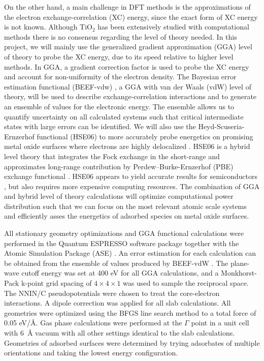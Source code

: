   
On the other hand, a main challenge in DFT methods \cite{Burke_2012, Parr_1980} is the approximations of the electron exchange-correlation (XC) energy, since the exact form of XC energy is not known. Although TiO$_2$ has been extensively studied with computational methods \cite{Jauho_2015, Diebold_2003, Schaub_2001, Morgan_2007, Landmann_2012, De_k_2011} there is no consensus regarding the level of theory needed. In this project, we will mainly use the generalized gradient approximation (GGA) level of theory to probe the XC energy, due to its speed relative to higher level methods. In GGA, a gradient correction factor is used to probe the XC energy and account for non-uniformity of the electron density. The Bayesian error estimation functional (BEEF-vdw) \cite{beef}, a GGA with van der Waals (vdW) level of theory, will be used to describe exchange-correlation interactions and to generate an ensemble of values for the electronic energy. The ensemble allows us to quantify uncertainty on all calculated systems such that critical intermediate states with large errors can be identified. We will also use the Heyd-Scuseria-Ernzerhof functional (HSE06) \cite{hse} to more accurately probe energetics on promising metal oxide surfaces where electrons are highly delocalized \cite{Burke_2012}. HSE06 is a hybrid level theory that integrates the Fock exchange in the short-range and approximates long-range contribution by Perdew–Burke-Ernzerhof (PBE) exchange functional \cite{SAVIN_1996}. HSE06 appears to yield accurate results for semiconductors \cite{hse}, but also requires more expensive computing resources. The combination of GGA and hybrid level of theory calculations will optimize computational power distribution such that we can focus on the most relevant atomic scale systems and efficiently asses the energetics of adsorbed species on metal oxide surfaces. 
 
All stationary geometry optimizations and GGA functional calculations were performed in the Quantum ESPRESSO software package \cite{QE} together with the Atomic Simulation Package (ASE) \cite{ase}. An error estimation for each calculation can be obtained from the ensemble of values produced by BEEF-vdW \cite{Medford_2014a}. The plane-wave cutoff energy was set at 400 eV for all GGA calculations, and a Monkhorst-Pack k-point grid spacing of {$4\times4\times 1$} was used to sample the reciprocal space. The NNIN/C pseudopotentials \cite{cornell} were chosen to treat the core-electron interactions. A dipole correction was applied for all slab calculations. All geometries were optimized using the BFGS line search method to a total force of 0.05 eV/\si{\angstrom}. Gas phase calculations were performed at the $\Gamma$ point in a unit cell with 6\textup{~\AA} vacuum with all other settings identical to the slab calculations. Geometries of adsorbed surfaces were determined by trying adsorbates of multiple orientations and taking the lowest energy configuration.  

